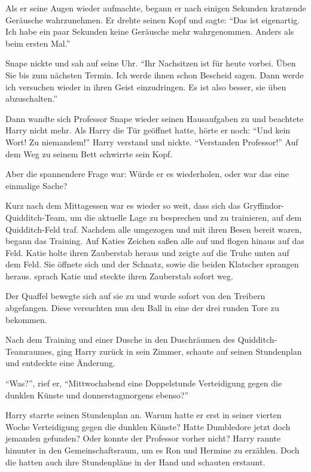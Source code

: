 Als er seine Augen wieder aufmachte, begann er nach einigen Sekunden kratzende Geräusche wahrzunehmen. Er drehte seinen Kopf und sagte: \enquote{Das ist eigenartig. Ich habe ein paar Sekunden keine Geräusche mehr wahrgenommen. Anders als beim ersten Mal.}

Snape nickte und sah auf seine Uhr. \enquote{Ihr Nachsitzen ist für heute vorbei. Üben Sie bis zum nächsten Termin. Ich werde ihnen schon Bescheid sagen. Dann werde ich versuchen wieder in ihren Geist einzudringen. Es ist also besser, sie üben abzuschalten.}

Dann wandte sich Professor Snape wieder seinen Hausaufgaben zu und beachtete Harry nicht mehr. Als Harry die Tür geöffnet hatte, hörte er noch: \enquote{Und kein Wort! Zu niemandem!} Harry verstand und nickte. \enquote{Verstanden Professor!} Auf dem Weg zu seinem Bett schwirrte sein Kopf. 

Aber die spannendere Frage war: Würde er es wiederholen, oder war das eine einmalige Sache?

\trenn

Kurz nach dem Mittagessen war es wieder so weit, dass sich das Gryffindor-Quidditch-Team, um die aktuelle Lage zu besprechen und zu trainieren, auf dem Quidditch-Feld traf. Nachdem alle umgezogen und mit ihren Besen bereit waren, begann das Training. Auf Katies Zeichen saßen alle auf und flogen hinaus auf das Feld. Katie holte ihren Zauberstab heraus und zeigte auf die Truhe unten auf dem Feld. Sie öffnete sich und der Schnatz, sowie die beiden Klatscher sprangen heraus.  sprach Katie und steckte ihren Zauberstab sofort weg.

Der Quaffel bewegte sich auf sie zu und wurde sofort von den Treibern abgefangen. Diese versuchten nun den Ball in eine der drei runden Tore zu bekommen.

Nach dem Training und einer Dusche in den Duschräumen des Quid\-ditch-Team\-rau\-mes, ging Harry zurück in sein Zimmer, schaute auf seinen Stundenplan und entdeckte eine Änderung.

\enquote{Was?}, rief er, \enquote{Mittwochabend eine Doppelstunde Verteidigung gegen die dunklen Künste und donnerstagmorgens ebenso?}

Harry starrte seinen Stundenplan an. Warum hatte er erst in seiner vierten Woche Verteidigung gegen die dunklen Künste? Hatte Dumbledore jetzt doch jemanden gefunden? Oder konnte der Professor vorher nicht? Harry rannte hinunter in den Gemeinschaftsraum, um es Ron und Hermine zu erzählen. Doch die hatten auch ihre Stundenpläne in der Hand und schauten erstaunt.

